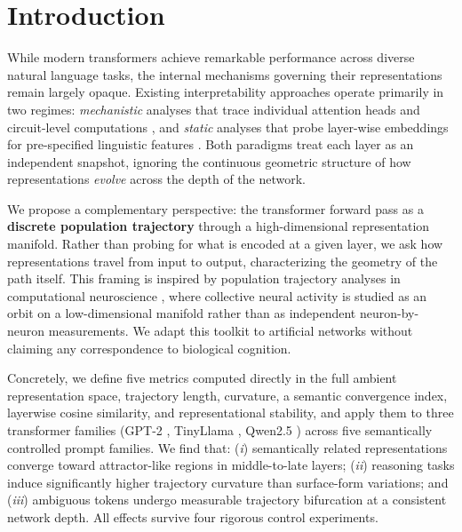 \documentclass{article}
\begin{document}
\section{Introduction}
\label{sec:introduction}

While modern transformers \cite{vaswani2017attention} achieve remarkable 
performance across diverse natural language tasks, the internal mechanisms 
governing their representations remain largely opaque. Existing interpretability  approaches operate primarily in two regimes: \textit{mechanistic} analyses that  trace individual attention heads and circuit-level computations  \cite{olsson2022incontext, elhage2021mathematical}, and \textit{static} analyses  that probe layer-wise embeddings for pre-specified linguistic features  \cite{tenney2019bert, jawahar2019bert}. Both paradigms treat each layer as an independent snapshot, ignoring the continuous geometric structure of how representations \textit{evolve} across the depth of the network.

We propose a complementary perspective: the transformer forward pass as a 
\textbf{discrete population trajectory} through a high-dimensional representation  manifold. Rather than probing for what is encoded at a given layer, we ask how representations travel from input to output, characterizing the geometry of the path itself. This framing is inspired by population trajectory analyses in computational neuroscience \cite{vyas2020computation, cunningham2014dimensionality},  where collective neural activity is studied as an orbit on a low-dimensional manifold rather than as independent neuron-by-neuron measurements. We adapt this 
toolkit to artificial networks without claiming any correspondence to biological cognition.

Concretely, we define five metrics computed directly in the full ambient 
representation space, trajectory length, curvature, a semantic convergence index,  layerwise cosine similarity, and representational stability, and apply them to three transformer families (GPT-2 \cite{radford2019language}, TinyLlama \cite{zhang2024tinyllama}, Qwen2.5 \cite{qwen2025qwen25}) across five semantically controlled prompt families. We find that: (\textit{i}) semantically related representations converge toward attractor-like regions in middle-to-late layers; (\textit{ii}) reasoning tasks induce significantly higher trajectory curvature than surface-form variations; and (\textit{iii}) ambiguous tokens undergo measurable trajectory bifurcation at a consistent network depth. All effects survive four rigorous control experiments.
\end{document}
